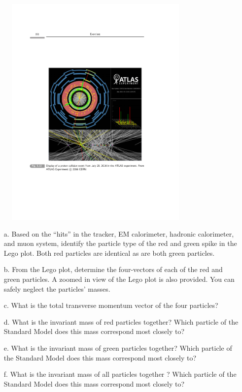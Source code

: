 {\begin{itemize}
{\begin{figure}[h!]
\centering
\includegraphics[width=0.8\textwidth]{./EventDisplay.pdf}
\end{figure}

\begin{itemize}
\item[a.]{ Based on the “hits” in the tracker, EM calorimeter, hadronic calorimeter, and muon system, identify the particle type of the red and green spike in the Lego plot. 
Both red particles are identical as are both green particles.}
\item[b.]{
From the Lego plot, determine the four-vectors of each of the red and green particles. 
A zoomed in view of the Lego plot is also provided. You can safely neglect the particles’ masses. 
}
\item[c.]{
What is the total transverse momentum vector of the four particles?
}
\item[d.]{What is the invariant mass of red particles together? Which particle of the Standard Model does this mass correspond most closely to?}
\item[e.]{What is the invariant mass of green particles together? Which particle of the Standard Model does this mass correspond most closely to?}
\item[f.]{What is the invariant mass of all particles together ? Which particle of the Standard Model does this mass correspond most closely to?}
\end{itemize}

}
\end{itemize}}
